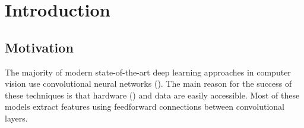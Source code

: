 \documentclass{l4proj}
\begin{document}
\tableofcontents

%
%
%

%
%
%
%
\chapter{Introduction}
\label{chap:intro}


\section{Motivation}
The majority of modern state-of-the-art deep learning approaches in computer vision use convolutional neural networks (\cite{convnets}). The main reason for the success of these techniques is that hardware (\cite{GPU}) and data are easily accessible. Most of these models extract features using feedforward connections between convolutional layers. 
\end{document}
